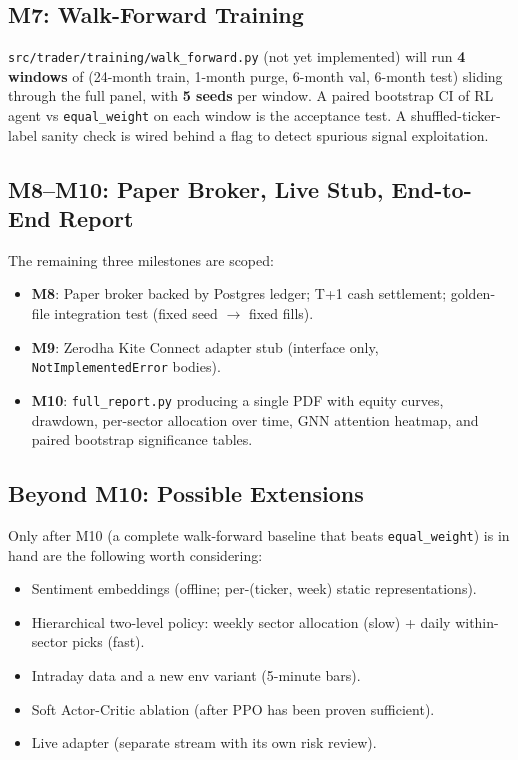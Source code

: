 \documentclass[11pt,a4paper]{article}
\begin{document}
\subsection{M7: Walk-Forward Training}

\texttt{src/trader/training/walk\_forward.py} (not yet implemented) will run
\textbf{4 windows} of (24-month train, 1-month purge, 6-month val, 6-month test)
sliding through the full panel, with \textbf{5 seeds} per window. A paired
bootstrap CI of RL agent vs \texttt{equal\_weight} on each window is the
acceptance test. A shuffled-ticker-label sanity check is wired behind a flag to
detect spurious signal exploitation.

\subsection{M8--M10: Paper Broker, Live Stub, End-to-End Report}

The remaining three milestones are scoped:
\begin{itemize}
\item \textbf{M8}: Paper broker backed by Postgres ledger; T+1 cash settlement;
golden-file integration test (fixed seed $\to$ fixed fills).
\item \textbf{M9}: Zerodha Kite Connect adapter stub (interface only,
\texttt{NotImplementedError} bodies).
\item \textbf{M10}: \texttt{full\_report.py} producing a single PDF with equity
curves, drawdown, per-sector allocation over time, GNN attention heatmap, and
paired bootstrap significance tables.
\end{itemize}

\subsection{Beyond M10: Possible Extensions}

Only after M10 (a complete walk-forward baseline that beats \texttt{equal\_weight})
is in hand are the following worth considering:
\begin{itemize}
\item Sentiment embeddings (offline; per-(ticker, week) static representations).
\item Hierarchical two-level policy: weekly sector allocation (slow) + daily
within-sector picks (fast).
\item Intraday data and a new env variant (5-minute bars).
\item Soft Actor-Critic ablation (after PPO has been proven sufficient).
\item Live adapter (separate stream with its own risk review).
\end{itemize}
\end{document}

